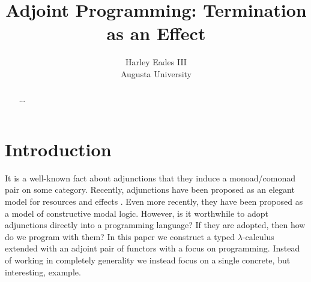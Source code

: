 \usepackage{amssymb,amsmath,amsthm}
\usepackage{stmaryrd}
\usepackage{todonotes}
\usepackage{mathpartir}
\usepackage{enumerate}
\usepackage{hyperref}

\usepackage[barr]{xy}
\let\mto\to
\let\to\rightarrow

\usepackage{color}
\usepackage{supertabular}




\newcommand{\cat}[1]{\mathcal{#1}}
\newcommand{\uar}[0]{\mathop{\uparrow}}
\newcommand{\dar}[0]{\mathop{\downarrow}}
\newcommand{\st}[1]{\mathsf{st}_{#1}}
\newcommand{\case}[0]{\mathsf{case}}
\newcommand{\cur}[1]{\mathsf{cur}(#1)}
\newcommand{\app}[0]{\mathsf{app}}
\newcommand{\id}[0]{\mathsf{id}}
\newcommand{\ifrName}[1]{#1}
\let\t\relax
\newcommand{\t}[0]{\mathsf{t}}

\title{Adjoint Programming: Termination as an Effect}

\author{Harley Eades III\\
  Augusta University}



\maketitle

\begin{abstract}
  ... 
\end{abstract}

\section{Introduction}
\label{sec:introduction}

It is a well-known fact about adjunctions that they induce a
monoad/comonad pair on some category.  Recently, adjunctions have been
proposed as an elegant model for resources and effects \cite{??}.
Even more recently, they have been proposed as a model of constructive
modal logic.  However, is it worthwhile to adopt adjunctions directly
into a programming language?  If they are adopted, then how do we
program with them?  In this paper we construct a typed
$\lambda$-calculus extended with an adjoint pair of functors with a
focus on programming.  Instead of working in completely generality we
instead focus on a single concrete, but interesting, example.

